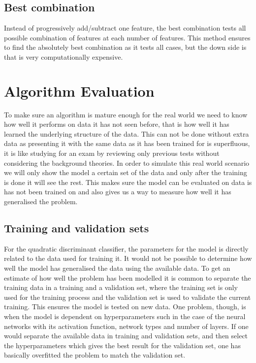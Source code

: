 \subsection{Best combination}

Instead of progressively add/subtract one feature, the best combination tests all possible combination of features at each number of features. This method ensures to find the absolutely best combination as it tests all cases, but the down side is that is very computationally expensive.

\section{Algorithm Evaluation}

To make sure an algorithm is mature enough for the real world we need to know how well it performs on data it has not seen before, that is how well it has learned the underlying structure of the data. This can not be done without extra data as presenting it with the same data as it has been trained for is superfluous, it is like studying for an exam by reviewing only previous tests without considering the background theories. In order to simulate this real world scenario we will only show the model a certain set of the data and only after the training is done it will see the rest. This makes sure the model can be evaluated on data is has not been trained on and also gives us a way to measure how well it has generalised the problem.

\subsection{Training and validation sets}

For the quadratic discriminant classifier, the parameters for the model is directly related to the data used for training it. It would not be possible to determine how well the model has generalised the data using the available data. To get an estimate of how well the problem has been modelled it is common to separate the training data in a training and a validation set, where the training set is only used for the training process and the validation set is used to validate the current training. This ensures the model is tested on new data. One problem, though, is when the model is dependent on hyperparameters such in the case of the neural networks with its activation function, network types and number of layers. If one would separate the available data in training and validation sets, and then select the hyperparameters which gives the best result for the validation set, one has basically overfitted the problem to match the validation set.

